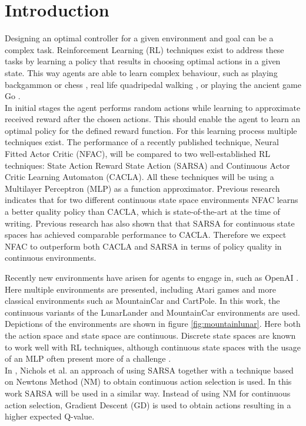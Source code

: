 
\section{Introduction}

Designing an optimal controller for a given environment and goal can be a complex task. Reinforcement Learning (RL) techniques exist to address these tasks by learning a policy that results in choosing optimal actions in a given state. This way agents are able to learn complex behaviour, such as playing backgammon \cite{tesauro2002programming} or chess \cite{baxter1999knightcap},
real life quadripedal walking \cite{kohl2004policy}, or playing the ancient game Go \cite{alphago}. \\  

In initial stages the agent performs random actions while learning to approximate received reward after the chosen actions. This should enable the agent to learn an optimal policy for the defined reward function. For this learning process multiple techniques exist. The performance of a recently published technique, Neural Fitted Actor Critic (NFAC), will be compared to two well-established RL techniques: State Action Reward State Action (SARSA) and Continuous Actor Critic Learning Automaton (CACLA). All these techniques will be using a Multilayer Perceptron (MLP) as a function approximator. Previous research \cite{zimmer2016neural} indicates that for two different continuous state space environments NFAC learns a better quality policy than CACLA, which is state-of-the-art at the time of writing. Previous research \cite{nichols2015continuous} has also shown that that SARSA for continuous state spaces has achieved comparable performance to CACLA. Therefore we expect NFAC to outperform both CACLA and SARSA in terms of policy quality in continuous environments.

Recently new environments have arisen for agents to engage in, such as OpenAI \cite{openaigym}. Here multiple environments are presented, including Atari games and more classical environments such as MountainCar and CartPole. In this work, the continuous variants of the LunarLander and MountainCar environments are used. Depictions of the environments are shown in figure \ref{fig:mountainlunar}. Here both the action space and state space are continuous.  Discrete state spaces are known to work well with RL techniques, although continuous state spaces with the usage of an MLP often present more of a challenge \cite{cetina2008multilayer}. \\
In \cite{nichols2015continuous}, Nichols et al. an approach of using SARSA together with a technique based on Newtons Method (NM) to obtain continuous action selection is used. In this work SARSA will be used in a similar way. Instead of using NM for continuous action selection, Gradient Descent (GD) is used to obtain actions resulting in a higher expected Q-value.

